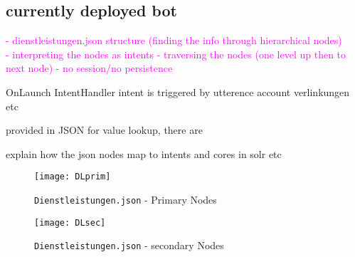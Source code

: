 \subsection*{currently deployed bot}



\textcolor{magenta}{
	- dienstleistungen.json structure (finding the info through hierarchical nodes)\\
	- interpreting the nodes as intents
	- traversing the nodes (one level up then to next node)
	- no session/no persistence
}


OnLaunch
IntentHandler
intent is triggered by utterence
account verlinkungen etc

%

provided in JSON for value lookup, there are


explain how the json nodes map to intents and cores in solr etc


\begin{figure}[h!]
	\caption{\lstinline|Dienstleistungen.json|  - Primary Nodes}
	\texttt{[image: DLprim]}
\end{figure}

\begin{figure}[h]
	\caption{\lstinline|Dienstleistungen.json| - secondary Nodes}
	\texttt{[image: DLsec]}
\end{figure}


